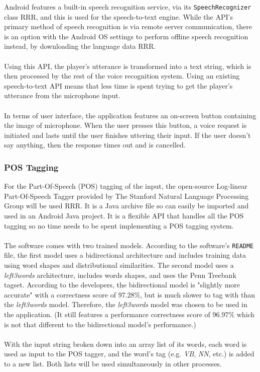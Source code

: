 \documentclass[12pt]{article}
\begin{document}
Android features a built-in speech recognition service, via its \texttt{SpeechRecognizer} class RRR, and this is used for the speech-to-text engine. While the API's primary method of speech recognition is via remote server communication, there is an option with the Android OS settings to perform offline speech recognition instead, by downloading the language data RRR.
\\
\\
Using this API, the player's utterance is transformed into a text string, which is then processed by the rest of the voice recognition system. Using an existing speech-to-text API means that less time is spent trying to get the player's utterance from the microphone input.
\\
\\
In terms of user interface, the application features an on-screen button containing the image of microphone. When the user presses this button, a voice request is initiated and lasts until the user finishes uttering their input. If the user doesn't say anything, then the response times out and is cancelled.

\subsubsection{POS Tagging}

For the Part-Of-Speech (POS) tagging of the input, the open-source Log-linear Part-Of-Speech Tagger provided by The Stanford Natural Language Processing Group will be used RRR. It is a Java archive file so can easily be imported and used in an Android Java project. It is a flexible API that handles all the POS tagging so no time needs to be spent implementing a POS tagging system. 
\\
\\
The software comes with two trained models. According to the software's \texttt{README} file, the first model uses a bidirectional architecture and includes training data using word shapes and distributional similarities. The second model uses a \textit{left3words} architecture, includes words shapes, and uses the Penn Treebank tagset. According to the developers, the bidirectional model is "slightly more accurate" with a correctness score of 97.28\%, but is much slower to tag with than the \textit{left3words} model. Therefore, the \textit{left3words} model was chosen to be used in the application. (It still features a performance correctness score of 96.97\% which is not that different to the bidirectional model's performance.)
\\
\\
With the input string broken down into an array list of its words, each word is used as input to the POS tagger, and the word's tag (e.g. \textit{VB}, \textit{NN}, etc.) is added to a new list. Both lists will be used simultaneously in other processes.
\end{document}
